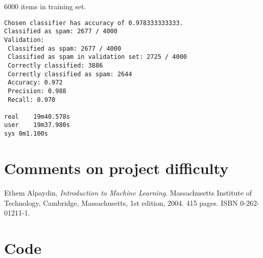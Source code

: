 \documentclass[a4paper,10pt]{article}
\begin{document}
6000 items in training set.

\begin{verbatim}
Chosen classifier has accuracy of 0.978333333333.
Classified as spam: 2677 / 4000
Validation:
 Classified as spam: 2677 / 4000
 Classified as spam in validation set: 2725 / 4000
 Correctly classified: 3886
 Correctly classified as spam: 2644
 Accuracy: 0.972
 Precision: 0.988
 Recall: 0.970

real	19m40.578s
user	19m37.980s
sys	0m1.100s
\end{verbatim}

\newpage
\section*{Comments on project difficulty}


\begin{thebibliography}{9}
  Ethem Alpaydin,
  \emph{Introduction to Machine Learning}.
  Massachusetts Institute of Technology, Cambridge, Massachusetts,
  1st edition,
  2004. 415 pages. ISBN 0-262-01211-1.
\end{thebibliography}


\newpage
\section*{Code}

\end{document}

